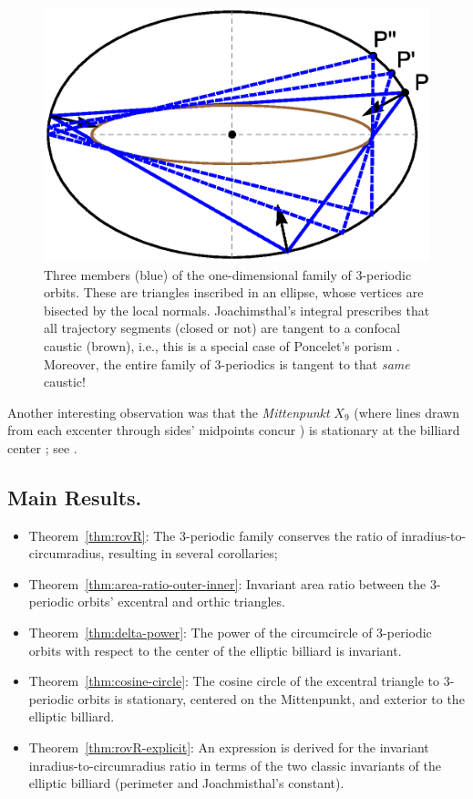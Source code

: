 \documentclass{article}
\theoremstyle{definition}
\begin{document}
\begin{figure}[H]
    \centering
    \includegraphics[width=.5\textwidth]{1020_three_orbits_proofs}
    \caption{Three members (blue) of the one-dimensional family of 3-periodic orbits. These are triangles inscribed in an ellipse, whose vertices are bisected by the local normals. Joachimsthal's integral \cite{sergei91} prescribes that all trajectory segments (closed or not) are tangent to a confocal caustic (brown), i.e., this is a special case of Poncelet's porism \cite{dragovic88}. Moreover, the entire family of 3-periodics is tangent to that {\em same} caustic!}
    \label{fig:three-orbits-proof}
\end{figure}

Another interesting observation was that the {\em Mittenpunkt} $X_9$ (where lines drawn from each excenter through sides' midpoints concur \cite[Mittenpunkt]{mw}) is stationary at the billiard center \cite{reznik2019-intelligencer}; see \cite[PL\#02]{reznik2020-playlist-proofs}. \\

\subsection{Main Results.}

\begin{itemize}
    \item Theorem~\ref{thm:rovR}: The 3-periodic family conserves the ratio of inradius-to-circumradius, resulting in several corollaries;
    \item Theorem~\ref{thm:area-ratio-outer-inner}: Invariant area ratio between the 3-periodic orbits' excentral and orthic triangles.
    \item Theorem~\ref{thm:delta-power}: The power of the circumcircle of 3-periodic orbits with respect to the center of the elliptic billiard is invariant.
    \item Theorem~\ref{thm:cosine-circle}: 
    The cosine circle of the excentral triangle to 3-periodic orbits is stationary, centered on the Mittenpunkt, and exterior to the elliptic billiard.
    \item Theorem~\ref{thm:rovR-explicit}: An expression is derived for the invariant inradius-to-circumradius ratio in terms of the two classic invariants of the elliptic billiard (perimeter and Joachmisthal's constant).
\end{itemize}
\end{document}
